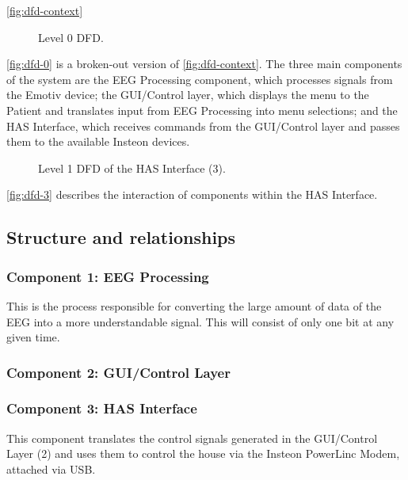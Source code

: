 \documentclass{article}
\begin{document}
\autoref{fig:dfd-context}

\begin{figure}[h!]
    \centering
    \resizebox{\textwidth}{!}{
        
    }
    \caption{Level 0 DFD.}
    \label{fig:dfd-0}
\end{figure}

\autoref{fig:dfd-0} is a broken-out version of \autoref{fig:dfd-context}. The
three main components of the system are the EEG Processing component, which
processes signals from the Emotiv device; the GUI/Control layer, which
displays the menu to the Patient and translates input from EEG Processing into
menu selections; and the HAS Interface, which receives commands from the
GUI/Control layer and passes them to the available Insteon devices.

\begin{figure}[h!]
    \centering
    \resizebox{\textwidth}{!}{
        
    }
    \caption{Level 1 DFD of the HAS Interface (3).}
    \label{fig:dfd-3}
\end{figure}

\autoref{fig:dfd-3} describes the interaction of components within the HAS
Interface.

\subsection{Structure and relationships}

\subsubsection{Component 1: EEG Processing}
This is the process responsible for converting the large amount of data of the
EEG into a more understandable signal. This will consist of only one bit at
any given time.

\subsubsection{Component 2: GUI/Control Layer}

\subsubsection{Component 3: HAS Interface}
This component translates the control signals generated in the GUI/Control
Layer (2) and uses them to control the house via the Insteon PowerLinc Modem,
attached via USB.
\end{document}

